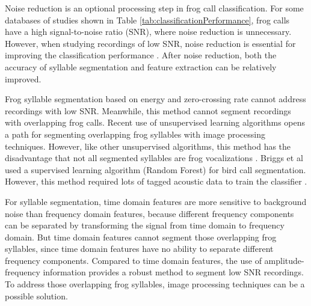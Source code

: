 Noise reduction is an optional processing step in frog call classification. For some databases of studies shown in Table \ref{tab:classificationPerformance}, frog calls have a high signal-to-noise ratio (SNR), where noise reduction is unnecessary. However, when studying recordings of low SNR, noise reduction is essential for improving the classification performance \citep{bedoya2014automatic, Huang20141}. After noise reduction, both the accuracy of syllable segmentation and feature extraction can be relatively improved.

Frog syllable segmentation based on energy and zero-crossing rate cannot address recordings with low SNR. Meanwhile, this method cannot segment recordings with overlapping frog calls. Recent use of unsupervised learning algorithms opens a path for segmenting overlapping frog syllables with image processing techniques. However, like other unsupervised algorithms, this method has the disadvantage that not all segmented syllables are frog vocalizations \citep{potamitis2015unsupervised}. Briggs et al used a supervised learning algorithm (Random Forest) for bird call segmentation. However, this method required lots of tagged acoustic data to train the classifier \citep{tjahja2015supervised}.

For syllable segmentation, time domain features are more sensitive to background noise than frequency domain features, because different frequency components can be separated by transforming the signal from time domain to frequency domain. But time domain features cannot segment those overlapping frog syllables, since time domain features have no ability to separate different frequency components. Compared to time domain features, the use of amplitude-frequency information provides a robust method to segment low SNR recordings. To address those overlapping frog syllables, image processing techniques can be a possible solution. 




